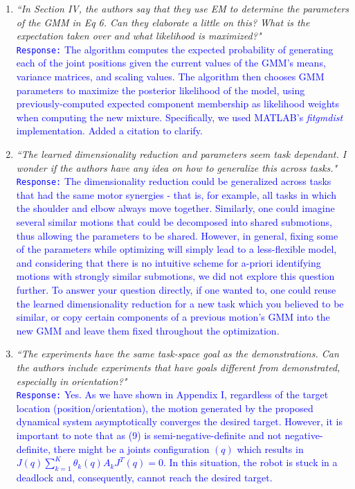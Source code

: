 \documentclass[10pt,stdletter,dateno]{newlfm}
\begin{document}
\begin{newlfm}
\begin{enumerate}
\item \textit{``In Section IV, the authors say that they use EM to determine the parameters of the GMM in Eq 6. Can
they elaborate a little on this? What is the expectation taken over and what likelihood is maximized?"}\\
\textcolor{blue}{\texttt{Response:} \small The algorithm computes the expected probability of generating each of the joint positions given the current values of the GMM's means, variance matrices, and scaling values. The algorithm then chooses GMM parameters to maximize the posterior likelihood of the model, using previously-computed expected component membership as likelihood weights when computing the new mixture. Specifically, we used MATLAB's \textit{fitgmdist} implementation. Added a citation to clarify.}\\

\item \textit{``The learned dimensionality reduction and parameters seem task dependant. I wonder if the authors
have any idea on how to generalize this across tasks."}\\
\textcolor{blue}{\texttt{Response:} \small The dimensionality reduction could be generalized across tasks that had the same motor synergies - that is, for example, all tasks in which the shoulder and elbow always move together. Similarly, one could imagine several similar motions that could be decomposed into shared submotions, thus allowing the parameters to be shared. However, in general, fixing some of the parameters while optimizing will simply lead to a less-flexible model, and considering that there is no intuitive scheme for a-priori identifying motions with strongly similar submotions, we did not explore this question further. To answer your question directly, if one wanted to, one could reuse the learned dimensionality reduction for a new task which you believed to be similar, or copy certain components of a previous motion's GMM into the new GMM and leave them fixed throughout the optimization.}\\

\item \textit{``The experiments have the same task-space goal as the
demonstrations. Can the authors include experiments that have goals
different from demonstrated, especially in orientation?"}\\
\textcolor{blue}{\texttt{Response:} \small Yes. As we have shown in Appendix I, regardless of the target location (position/orientation), the motion generated by the proposed dynamical system asymptotically converges the desired target. However, it is important to note that as (9) is semi-negative-definite and not negative-definite, there might be a joints configuration $ (q )$ which results in $ J(q)\sum\limits_{k=1}^{K}\theta_k(q)A_kJ^T(q)=0 $. In this situation, the robot is stuck in a deadlock and, consequently, cannot reach the desired target.    }\\


\end{enumerate}
\end{newlfm}
\end{document}
